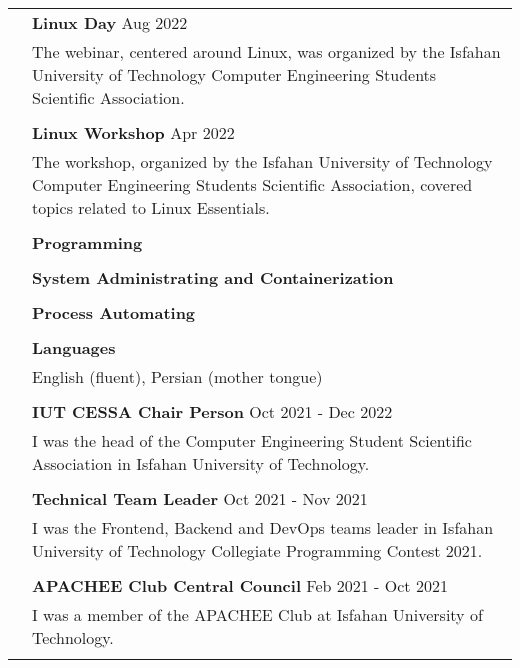 \documentclass[letterpaper, 11pt]{article}
\begin{document}
\begin{longtable}{p{1.3in}p{4.8in}}
& \textbf{Linux Day} \hfill Aug 2022 \\
& The webinar, centered around Linux, was organized by the Isfahan University of Technology Computer Engineering Students Scientific Association. \\
& \\

& \textbf{Linux Workshop} \hfill  Apr 2022 \\
& The workshop, organized by the Isfahan University of Technology Computer Engineering Students Scientific Association, covered topics related to Linux Essentials. \\
& \\


{\color{MidnightBlue}{Skills}} 
& \textbf{Programming}\\
& \\

& \textbf{System Administrating and Containerization}\\
& \\

& \textbf{Process Automating}\\
& \\

& \textbf{Languages} \\
& English (fluent), Persian (mother tongue) \\
& \\


\color{MidnightBlue}{Volunteer Activities}
& \textbf{IUT CESSA Chair Person} \hfill Oct 2021 - Dec 2022 \\
& I was the head of the Computer Engineering Student Scientific Association in Isfahan University of Technology. \\
& \\

& \textbf{Technical Team Leader} \hfill Oct 2021 - Nov 2021 \\
& I was the Frontend, Backend and DevOps teams leader in Isfahan University of Technology Collegiate Programming Contest 2021. \\
& \\

& \textbf{APACHEE Club Central Council} \hfill Feb 2021 - Oct 2021 \\
& I was a member of the APACHEE Club at Isfahan University of Technology. \\
& \\


\end{longtable}
\end{document}
